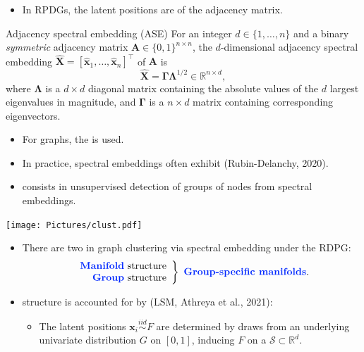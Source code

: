 \documentclass[portrait,final,x11names,a0paper,fontscale=0.36]{baposter}
\newcommand{\icl}[1]{{\bf\color{blue_icl2}{#1}}}
\renewcommand{\vec}[1]{\boldsymbol{#1}}
\newcommand{\mvec}[1]{\mathbf{#1}}
\begin{document}
\begin{poster}
{\begin{itemize}[leftmargin=.15in]
\item In RPDGs, the latent positions are \icl{estimated via spectral decomposition} of the adjacency matrix. %
\end{itemize}

\begin{defi}{Adjacency spectral embedding (ASE)}{}
For an integer $d\in\{1,\ldots,n\}$ and a binary \emph{symmetric} adjacency matrix $\mvec A\in\{0,1\}^{n\times n}$, the $d$-dimensional adjacency spectral embedding %
$\hat{\mvec X}=[\hat{\vec x}_{1},\dots,\hat{\vec x}_{n}]^\intercal$ of $\mvec A$ is 
\begin{equation}
\hat{\mvec X} = \mvec\Gamma\mvec\Lambda^{1/2}\in\mathbb R^{n\times d},
\end{equation}
where $\mvec\Lambda$ is a $d\times d$ diagonal matrix containing the absolute values of the $d$ largest eigenvalues in magnitude, %
and $\mvec\Gamma$ is a $n\times d$ matrix containing corresponding %
eigenvectors.
\end{defi}

\begin{itemize}[leftmargin=.15in]
\item For \icl{directed} graphs, the \icl{singular value decomposition (SVD)} is used. 

\item In practice, spectral embeddings often exhibit \icl{manifold structure} (Rubin-Delanchy, 2020).
\item \icl{Spectral graph clustering} consists in unsupervised detection of groups of nodes from spectral embeddings. 
\end{itemize}
\begin{center}
\texttt{[image: Pictures/clust.pdf]}
\end{center}
\begin{itemize}[leftmargin=.15in]
\item There are two \icl{simultaneous challenges} in graph clustering via spectral embedding under the RDPG: 
\begin{equation}
\left.\begin{array}{r}\text{\icl{Manifold}\ structure} \\ \text{\icl{Group}\ structure} \end{array}\right\}\ \text{\icl{Group-specific manifolds}}. 
\end{equation}

\item \icl{Manifold} structure is accounted for by \icl{latent structure models} (LSM, Athreya et al., 2021): 
\begin{itemize}
\item The latent positions $\vec x_i \overset{iid}{\sim} F$ are determined by draws from an underlying univariate distribution $G$ on $[0,1]$, inducing $F$ on a %
\icl{univariate submanifold} $\mathcal S\subset\mathbb R^d$. 


\end{itemize}
\end{itemize}}
\end{poster}
\end{document}

